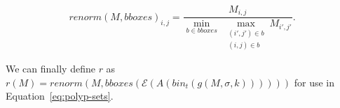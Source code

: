 \documentclass[10pt]{article}
\def\I{\mathbb{I}}
\def\E{\mathbb{E}}
\newcommand{\T}{\mathcal{T}}
\renewcommand{\S}{\mathcal{S}}
\newcommand{\lihua}[1]{{\color{blue} #1}}
\begin{document}
\begin{equation}
    renorm(M,bboxes)_{i,j} = \frac{M_{i,j}}{\underset{b \in bboxes}{\min} \; \underset{\substack{(i',j')\in b \\ (i,j) \in b}}{\max} M_{i',j'}}.
\end{equation}

We can finally define $r$ as $r(M) = renorm(M,bboxes(\mathcal{E}(A(bin_t(g(M,\sigma,k))))))$ for use in Equation~\ref{eq:polyp-sets}.




\end{document}
